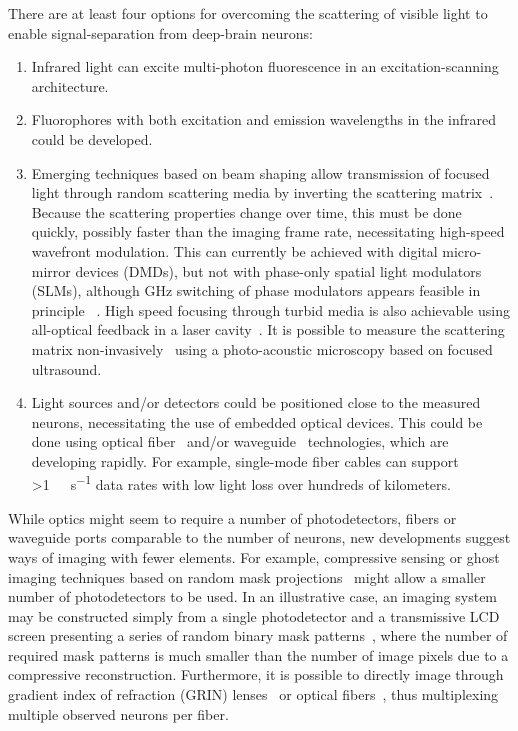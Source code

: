 There are at least four options for overcoming the scattering of visible light to enable signal-separation from deep-brain neurons:

\begin{enumerate}
\item Infrared light can excite multi-photon fluorescence in an excitation-scanning architecture.
\item Fluorophores with both excitation and emission wavelengths in the infrared could be developed.
\item Emerging techniques based on beam shaping allow transmission of focused light through random scattering media by inverting the scattering matrix~\cite{conkey12}.
Because the scattering properties change over time, this must be done quickly, possibly faster than the imaging frame rate, necessitating high-speed wavefront modulation.
This can currently be achieved with digital micro-mirror devices (DMDs), but not with phase-only spatial light modulators (SLMs), although GHz switching of phase modulators appears feasible in principle ~\cite{alivisatos13}. High speed focusing through turbid media is also achievable using all-optical feedback in a laser cavity~\cite{Nixon2013}.
It is possible to measure the scattering matrix non-invasively~\cite{Chaigne2013} using a photo-acoustic microscopy based on focused ultrasound.
\item Light sources and/or detectors could be positioned close to the measured neurons, necessitating the use of embedded optical devices.
This could be done using optical fiber~\cite{mahalati13} and/or waveguide~\cite{zorzos10,zorzos12} technologies, which are developing rapidly.
For example, single-mode fiber cables can support \SI{>1}{\tera\byte\per\second} data rates with low light loss over hundreds of kilometers.
\end{enumerate}

While optics might seem to require a number of photodetectors, fibers or waveguide ports comparable to the number of neurons, new developments suggest ways of imaging with fewer elements.
For example, compressive sensing or ghost imaging techniques based on random mask projections~\cite{wakin06,studer12,tian11,sun13} might allow a smaller number of photodetectors to be used.
In an illustrative case, an imaging system may be constructed simply from a single photodetector and a transmissive LCD screen presenting a series of random binary mask patterns~\cite{huang13}, where the number of required mask patterns is much smaller than the number of image pixels due to a compressive reconstruction.
Furthermore, it is possible to directly image through gradient index of refraction (GRIN) lenses~\cite{murray12} or optical fibers~\cite{mahalati13,kang10,flusberg05}, thus multiplexing multiple observed neurons per fiber.

